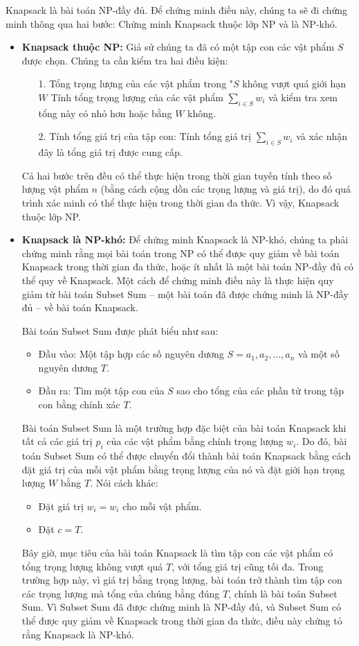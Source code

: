 Knapsack là bài toán NP-đầy đủ. Để chứng minh điều này, chúng ta sẽ đi chứng minh thông qua hai bước: Chứng minh Knapsack thuộc lớp NP và là NP-khó.
\begin{itemize}
    \item \textbf{Knapsack thuộc NP:} Giả sử chúng ta đã có một tập con các vật phẩm $S$ được chọn. Chúng ta cần kiểm tra hai điều kiện:
    \begin{itemize}
        \item [1.] Tổng trọng lượng của các vật phẩm trong 
    "$S$ không vượt quá giới hạn $W$ Tính tổng trọng lượng của các vật phẩm $\sum_{i \in S}w_i$ và kiểm tra xem tổng này có nhỏ hơn hoặc bằng $W$ không.
        \item [2.] Tính tổng giá trị của tập con: Tính tổng giá trị
        $\sum_{i \in S}w_i$ và xác nhận đây là tổng giá trị được cung cấp.
    \end{itemize}
    Cả hai bước trên đều có thể thực hiện trong thời gian tuyến tính theo số lượng vật phẩm $n$ (bằng cách cộng dồn các trọng lượng và giá trị), do đó quá trình xác minh có thể thực hiện trong thời gian đa thức. Vì vậy, Knapsack thuộc lớp NP.
    \item \textbf{Knapsack là NP-khó:} Để chứng minh Knapsack là NP-khó, chúng ta phải chứng minh rằng mọi bài toán trong NP có thể được quy giảm về bài toán Knapsack trong thời gian đa thức, hoặc ít nhất là một bài toán NP-đầy đủ có thể quy về Knapsack. Một cách để chứng minh điều này là thực hiện quy giảm từ bài toán Subset Sum – một bài toán đã được chứng minh là NP-đầy đủ – về bài toán Knapsack.

    Bài toán Subset Sum được phát biểu  như sau: \begin{itemize}
        \item Đầu vào: Một tập hợp các số nguyên dương $S={a_1, a_2,\dots,a_n}$ và một số nguyên dương $T$.
        \item Đầu ra: Tìm một tập con của $S$ sao cho tổng của các phần tử trong tập con bằng chính xác $T$.
    \end{itemize}
    Bài toán Subset Sum là một trường hợp đặc biệt của bài toán Knapsack khi tất cả các giá trị $p_i$ của các vật phẩm bằng chính trọng lượng $w_i$. Do đó, bài toán Subset Sum có thể được chuyển đổi thành bài toán Knapsack bằng cách đặt giá trị của mỗi vật phẩm bằng trọng lượng của nó và đặt giới hạn trọng lượng $W$ bằng $T$. Nói cách khác:
    \begin{itemize}
        \item Đặt giá trị $w_i = w_i$ cho mỗi vật phẩm.
        \item Đặt $c=T$.
    \end{itemize}
    Bây giờ, mục tiêu của bài toán Knapsack là tìm tập con các vật phẩm có tổng trọng lượng không vượt quá $T$, với tổng giá trị cũng tối đa. Trong trường hợp này, vì giá trị bằng trọng lượng, bài toán trở thành tìm tập con các trọng lượng mà tổng của chúng bằng đúng $T$, chính là bài toán Subset Sum. Vì Subset Sum đã được chứng minh là NP-đầy đủ, và Subset Sum có thể được quy giảm về Knapsack trong thời gian đa thức, điều này chứng tỏ rằng Knapsack là NP-khó.
\end{itemize}
